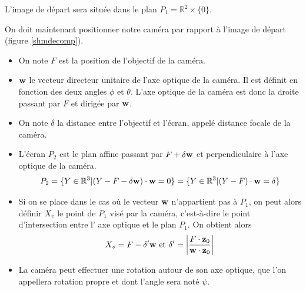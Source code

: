 L'image de départ sera située dans le plan $P_{1}= \mathbb{R}^{2}\times \{0\}$.

On doit maintenant positionner notre caméra par rapport à l'image de départ (figure \ref{shmdecomp}).

\begin{Not}
\begin{itemize}
\item On note $F$ est la position de l'objectif de la caméra.

\item $\mathbf{w}$ le vecteur directeur unitaire de l'axe optique de la caméra. Il est définit en fonction des deux angles $\phi$ et $\theta$. L'axe optique de la caméra est donc la droite passant par $F$ et dirigée par $\mathbf{w}$.

\item On note $\delta$ la distance entre l'objectif et l'écran, appelé distance focale de la caméra.

\item L'écran $P_{2}$ est le plan affine passant par $F+\delta \mathbf{w}$ et perpendiculaire à l'axe optique de la caméra.
\begin{equation*}
P_{2}=\{Y\in \mathbb{R}^{3}|(Y-F-\delta \mathbf{w})\cdot \mathbf{w}=0\}=\{Y\in \mathbb{R}^{3}|(Y-F)\cdot \mathbf{w}=\delta\}
\end{equation*}

\item Si on se place dans le cas où le vecteur $\mathbf{w}$ n'appartient pas à $P_{1}$, on peut alors définir $X_{v}$ le point de $P_{1}$ visé par la caméra, c'est-à-dire le point d'intersection entre l' axe optique et le plan $P_{1}$. On obtient alors
\begin{equation*}
X_{v}=F-\delta'\mathbf{w} \text{ et }\delta'=\small{\left|\frac{F \cdot \mathbf{z}_{0}}{\mathbf{w}\cdot \mathbf{z}_{0}} \right|}
\end{equation*}

\item La caméra peut  effectuer une rotation autour de son axe optique, que l'on appellera rotation propre et dont l'angle sera noté $\psi$.
\end{itemize}
\label{defpoint}
\end{Not}

